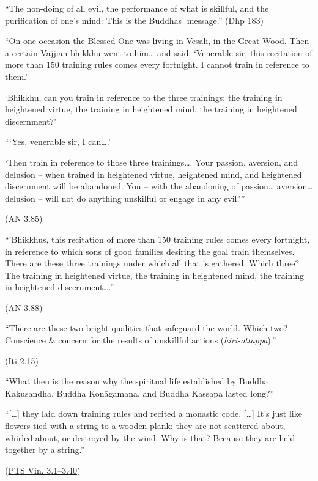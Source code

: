 ``The non-doing of all evil, the performance of what is skillful, and
the purification of one's mind: This is the Buddhas' message.'' (Dhp
183)

``On one occasion the Blessed One was living in Vesali, in the Great
Wood. Then a certain Vajjian bhikkhu went to him\ldots{} and said:
`Venerable sir, this recitation of more than 150 training rules comes
every fortnight. I cannot train in reference to them.'

`Bhikkhu, can you train in reference to the three trainings: the
training in heightened virtue, the training in heightened mind, the
training in heightened discernment?'

```Yes, venerable sir, I can\ldots.'

`Then train in reference to those three trainings\ldots. Your passion,
aversion, and delusion -- when trained in heightened virtue, heightened
mind, and heightened discernment will be abandoned. You -- with the
abandoning of passion\ldots{} aversion\ldots{} delusion -- will not do
anything unskilful or engage in any evil.'''

(AN 3.85)

``'Bhikkhus, this recitation of more than 150 training rules comes every
fortnight, in reference to which sons of good families desiring the goal
train themselves. There are these three trainings under which all that
is gathered. Which three? The training in heightened virtue, the
training in heightened mind, the training in heightened
discernment\ldots.''

(AN 3.88)

``There are these two bright qualities that safeguard the world. Which
two? Conscience \& concern for the results of unskillful actions
(\emph{hiri-ottappa}).''

(\href{https://www.accesstoinsight.org/tipitaka/kn/iti/iti.2.028-049.than.html\#iti-042}{Iti
2.15})

``What then is the reason why the spiritual life established by Buddha
Kakusandha, Buddha Konāgamana, and Buddha Kassapa lasted long?''

``{[}\ldots{]} they laid down training rules and recited a monastic
code. {[}\ldots{]} It's just like flowers tied with a string to a wooden
plank: they are not scattered about, whirled about, or destroyed by the
wind. Why is that? Because they are held together by a string.''

(\href{https://suttacentral.net/pli-tv-bu-vb-pj1/en/brahmali}{PTS Vin.
3.1--3.40})

